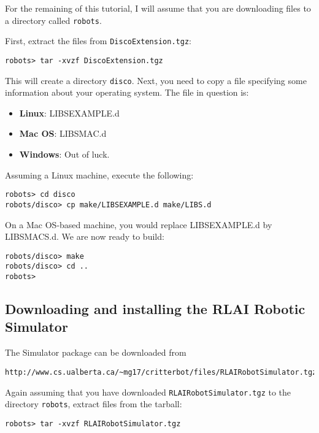 \documentclass[12pt]{article}
\begin{document}
For the remaining of this tutorial, I will assume that you are downloading
files to a directory called \verb+robots+.

First, extract the files from \verb+DiscoExtension.tgz+:

\begin{verbatim}robots> tar -xvzf DiscoExtension.tgz \end{verbatim}

This will create a directory \verb+disco+. Next, you need to copy a file 
specifying some information about your operating system. The file in question 
is:

\begin{itemize}
\item{\textbf{Linux}: LIBSEXAMPLE.d}
\item{\textbf{Mac OS}: LIBSMAC.d}
\item{\textbf{Windows}: Out of luck.}
\end{itemize}

Assuming a Linux machine, execute the following:

\begin{verbatim}
robots> cd disco
robots/disco> cp make/LIBSEXAMPLE.d make/LIBS.d
\end{verbatim}

On a Mac OS-based machine, you would replace LIBSEXAMPLE.d by LIBSMACS.d. We 
are now ready to build:

\begin{verbatim}
robots/disco> make
robots/disco> cd ..
robots>
\end{verbatim}

\subsection{Downloading and installing the RLAI Robotic Simulator}

The Simulator package can be downloaded from

\begin{verbatim}
http://www.cs.ualberta.ca/~mg17/critterbot/files/RLAIRobotSimulator.tgz
\end{verbatim}

Again assuming that you have downloaded \verb+RLAIRobotSimulator.tgz+ to
the directory \verb+robots+, extract files from the tarball:

\begin{verbatim}robots> tar -xvzf RLAIRobotSimulator.tgz \end{verbatim}
\end{document}
